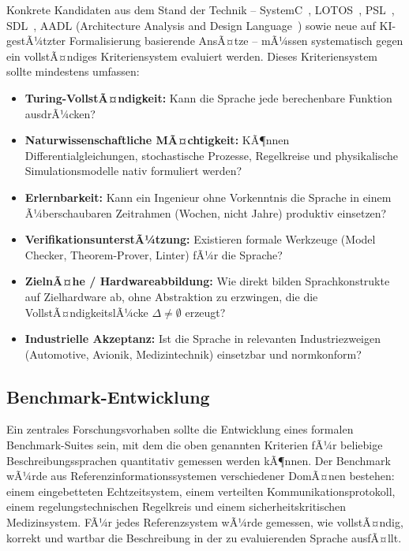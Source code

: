 ﻿\documentclass[a4paper,12pt]{report}
\theoremstyle{definition}
\begin{document}
Konkrete Kandidaten aus dem Stand der Technik -- SystemC~\cite{systemc2012},
LOTOS~\cite{lotos1988}, PSL~\cite{psl2005}, SDL~\cite{sdl2000}, AADL (Architecture
Analysis and Design Language~\cite{aadl2004}) sowie neue auf KI-gestÃ¼tzter
Formalisierung basierende AnsÃ¤tze -- mÃ¼ssen systematisch gegen ein vollstÃ¤ndiges
Kriteriensystem evaluiert werden. Dieses Kriteriensystem sollte mindestens umfassen:

\begin{itemize}
  \item \textbf{Turing-VollstÃ¤ndigkeit:} Kann die Sprache jede berechenbare Funktion ausdrÃ¼cken?
  \item \textbf{Naturwissenschaftliche MÃ¤chtigkeit:} KÃ¶nnen Differentialgleichungen,
        stochastische Prozesse, Regelkreise und physikalische Simulationsmodelle nativ
        formuliert werden?
  \item \textbf{Erlernbarkeit:} Kann ein Ingenieur ohne Vorkenntnis die Sprache in einem
        Ã¼berschaubaren Zeitrahmen (Wochen, nicht Jahre) produktiv einsetzen?
  \item \textbf{VerifikationsunterstÃ¼tzung:} Existieren formale Werkzeuge
        (Model Checker, Theorem-Prover, Linter) fÃ¼r die Sprache?
  \item \textbf{ZielnÃ¤he / Hardwareabbildung:} Wie direkt bilden Sprachkonstrukte
        auf Zielhardware ab, ohne Abstraktion zu erzwingen, die die VollstÃ¤ndigkeitslÃ¼cke
        $\Delta \neq \emptyset$ erzeugt?
  \item \textbf{Industrielle Akzeptanz:} Ist die Sprache in relevanten Industriezweigen
        (Automotive, Avionik, Medizintechnik) einsetzbar und normkonform?
\end{itemize}

\subsection{Benchmark-Entwicklung}

Ein zentrales Forschungsvorhaben sollte die Entwicklung eines formalen Benchmark-Suites
sein, mit dem die oben genannten Kriterien fÃ¼r beliebige Beschreibungssprachen quantitativ
gemessen werden kÃ¶nnen. Der Benchmark wÃ¼rde aus Referenzinformationssystemen verschiedener
DomÃ¤nen bestehen: einem eingebetteten Echtzeitsystem, einem verteilten Kommunikationsprotokoll,
einem regelungstechnischen Regelkreis und einem sicherheitskritischen Medizinsystem.
FÃ¼r jedes Referenzsystem wÃ¼rde gemessen, wie vollstÃ¤ndig, korrekt und wartbar die Beschreibung
in der zu evaluierenden Sprache ausfÃ¤llt.
\end{document}
